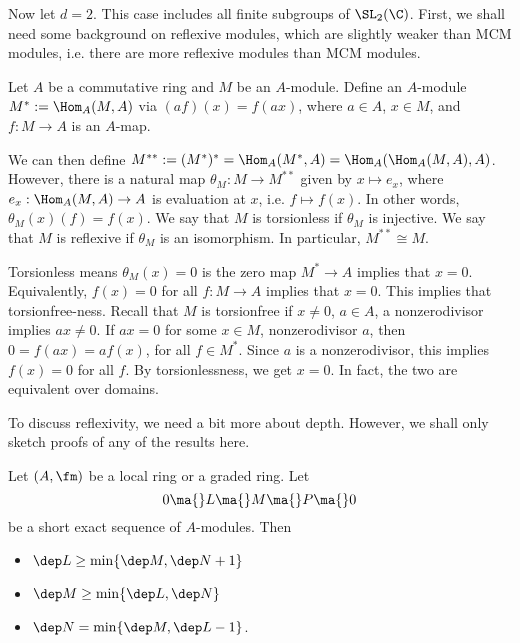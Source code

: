 Now let $d=2$. This case includes all finite subgroups of $\SL_2(\C)$. First, we shall need some background on reflexive modules, which are slightly weaker than MCM modules, i.e. there are more reflexive modules than MCM modules. 


\begin{dfn}
Let $A$ be a commutative ring and $M$ be an $A$-module. Define an $A$-module $M^*:= \Hom_A(M,A)$ via $(af)(x)= f(ax)$, where $a \in A$, $x \in M$, and $f: M \to A$ is an $A$-map. 
\end{dfn}


We can then define $M^{**}:=(M^*)^*=\Hom_A(M^*,A)= \Hom_A(\Hom_A(M,A),A)$. However, there is a natural map $\theta_M: M \to M^{**}$ given by $x \mapsto e_x$, where $e_x: \Hom_A(M,A) \to A$ is evaluation at $x$, i.e. $f \mapsto f(x)$. In other words, $\theta_M(x)(f)=f(x)$. We say that $M$ is torsionless if $\theta_M$ is injective. We say that $M$ is reflexive if $\theta_M$ is an isomorphism. In particular, $M^{**} \cong M$. 


\begin{rem}
Torsionless means $\theta_M(x)=0$ is the zero map $M^* \to A$ implies that $x=0$. Equivalently, $f(x)=0$ for all $f: M \to A$ implies that $x=0$. This implies that torsionfree-ness. Recall that $M$ is torsionfree if $x \neq 0$, $a \in A$, a nonzerodivisor implies $ax\neq 0$. If $ax=0$ for some $x \in M$, nonzerodivisor $a$, then $0= f(ax)= af(x)$, for all $f \in M^*$. Since $a$ is a nonzerodivisor, this implies $f(x)=0$ for all $f$. By torsionlessness, we get $x=0$. In fact, the two are equivalent over domains. 
\end{rem}


To discuss reflexivity, we need a bit more about depth. However, we shall only sketch proofs of any of the results here. 


\begin{lem} \label{lem:depth}
Let $(A,\fm)$ be a local ring or a graded ring. Let 
	\[
	0 \ma{} L \ma{} M \ma{} P \ma{} 0
	\]
be a short exact sequence of $A$-modules. Then
	\begin{itemize}
	\item $\dep L \geq \min\{ \dep M, \dep N+1\}$
	\item $\dep M \geq \min\{ \dep L, \dep N\}$
	\item $\dep N = \min\{ \dep M, \dep L-1\}$.
	\end{itemize}
\end{lem}

